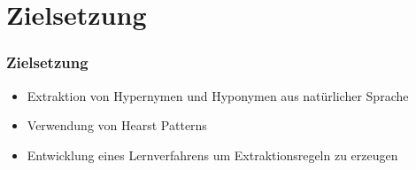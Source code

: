 \section{Zielsetzung}
\label{sec:zielsetzung}

\begin{frame}
  \frametitle{Zielsetzung}

  \begin{itemize}
  \item Extraktion von Hypernymen und Hyponymen aus natürlicher
    Sprache
  \item Verwendung von Hearst Patterns
  \item Entwicklung eines Lernverfahrens um Extraktionsregeln zu
    erzeugen
  \end{itemize}
\end{frame}
